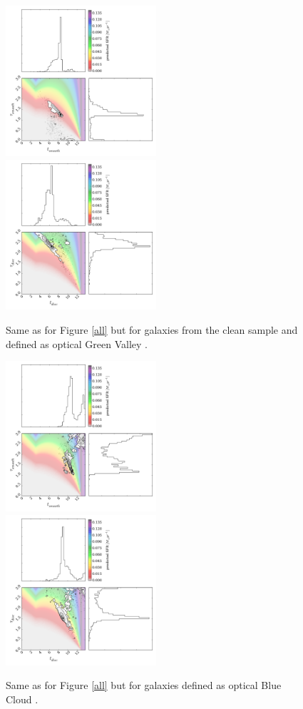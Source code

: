 \documentclass{mn2e}
\begin{document}
\begin{figure}
\includegraphics[width=0.4975\textwidth]{gv_smooth_clean.pdf}
\includegraphics[width=0.4975\textwidth]{gv_disc_clean.pdf}
\caption{Same as for Figure \ref{all} but for galaxies from the clean sample and defined as optical Green Valley \cite{Baldry04}.}
\label{gv_clean}
\end{figure}

\begin{figure}
\includegraphics[width=0.4975\textwidth]{blue_c_smooth.pdf}
\includegraphics[width=0.4975\textwidth]{blue_c_disc.pdf}
\caption{Same as for Figure \ref{all} but for galaxies defined as optical Blue Cloud \cite{Baldry04}.}
\label{blue_c}
\end{figure}
\end{document}
